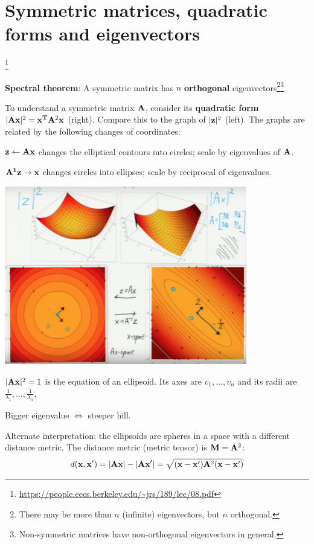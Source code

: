 \section{Symmetric matrices, quadratic forms and eigenvectors}
\footnote{\url{https://people.eecs.berkeley.edu/~jrs/189/lec/08.pdf}}


\textbf{Spectral theorem}: A symmetric matrix has $n$ \textbf{orthogonal}
eigenvectors\footnote{There may be more than $n$ (infinite) eigenvectors, but
  $n$ orthogonal.}\footnote{Non-symmetric matrices have non-orthogonal eigenvectors in
  general.}


To understand a symmetric matrix $\mathbf A$, consider its \textbf{quadratic form}
$|\mathbf A\mathbf x|^2 = \mathbf x^{\mathbf{T}} \mathbf A^2\mathbf x$ (right). Compare this to the graph of $|\mathbf z|^2$
(left). The graphs are related by the following changes of coordinates:

$\mathbf z \gets \mathbf A\mathbf x$ changes the elliptical contours into circles; scale by eigenvalues of $\mathbf A$.

$\mathbf A^{\mathbf 1} \mathbf z \to \mathbf x$ changes circles into ellipses; scale by reciprocal of eigenvalues.

\includegraphics[width=300pt]{img/machine-learning-quadratic-form-eigenvectors.png}

$|\mathbf A\mathbf x|^2 = 1$ is the equation of an ellipsoid. Its axes are $v_1,\ldots,v_n$
and its radii are $\frac{1}{\lambda_1},\ldots,\frac{1}{\lambda_n},$

Bigger eigenvalue $\iff$ steeper hill.

Alternate interpretation: the ellipsoids are spheres in a space with a
different distance metric. The distance metric (metric tensor) is $\mathbf M=\mathbf A^2$:
\begin{align*}
  d(\mathbf x,\mathbf x') = |\mathbf A\mathbf x| - |\mathbf A\mathbf x'| = \sqrt{(\mathbf x - \mathbf x')\mathbf A^2(\mathbf x - \mathbf x')}
\end{align*}


